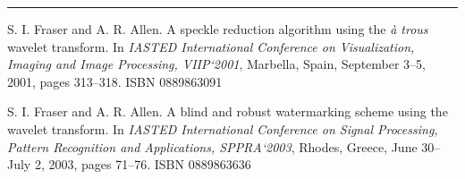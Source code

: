 \documentclass[12pt]{report}
\renewcommand{\baselinestretch}{1.5}
\begin{document}
\par
\rule{0.6cm}{0cm}S. I. Fraser and A. R. Allen. 
A speckle reduction algorithm using the \emph{\`a trous} wavelet transform.
In 
\emph{IASTED International Conference on Visualization, Imaging and Image Processing, VIIP`2001},
Marbella, Spain, September 3--5, 2001, pages 313--318. ISBN 0889863091 \\ 

\par
S. I. Fraser and A. R. Allen.
A blind and robust watermarking scheme using the wavelet transform.
In 
\emph{IASTED International Conference on Signal Processing, Pattern Recognition and Applications, SPPRA`2003},
Rhodes, Greece, June 30--July 2, 2003, pages 71--76. ISBN 0889863636 \\





\renewcommand{\baselinestretch}{1}
\begin{footnotesize}


\end{footnotesize}
\renewcommand{\baselinestretch}{1.5}
 
\end{document}
